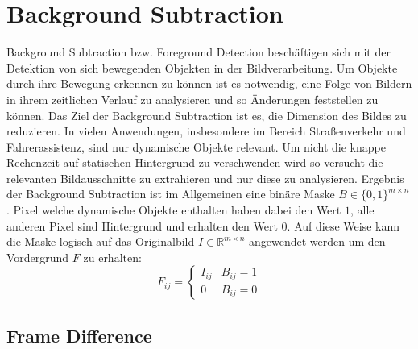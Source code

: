 \chapter{Background Subtraction}
Background Subtraction bzw. Foreground Detection besch\"aftigen sich mit der Detektion von sich bewegenden Objekten in der Bildverarbeitung. Um Objekte durch ihre Bewegung erkennen zu k\"onnen ist es notwendig, eine Folge von Bildern in ihrem zeitlichen Verlauf zu analysieren und so \"Anderungen feststellen zu k\"onnen. Das Ziel der Background Subtraction ist es, die Dimension des Bildes zu reduzieren. In vielen Anwendungen, insbesondere im Bereich Stra\ss{}enverkehr und Fahrerassistenz, sind nur dynamische Objekte relevant. Um nicht die knappe Rechenzeit auf statischen Hintergrund zu verschwenden wird so versucht die relevanten Bildausschnitte zu extrahieren und nur diese zu analysieren.
Ergebnis der Background Subtraction ist im Allgemeinen eine bin\"are Maske \(B \in \{0,1\}^{m \times n} \). Pixel welche dynamische Objekte enthalten haben dabei den Wert \(1\), alle anderen Pixel sind Hintergrund und erhalten den Wert \(0\). Auf diese Weise kann die Maske logisch auf das Originalbild \(I \in \mathbb{R}^{m \times n} \) angewendet werden um den Vordergrund \(F \) zu erhalten:
\begin{equation*}
 F_{ij} = 
 \begin{cases}
  I_{ij} & B_{ij}=1 \\
  0 & B_{ij}=0
 \end{cases}
\end{equation*}

\section{Frame Difference}

